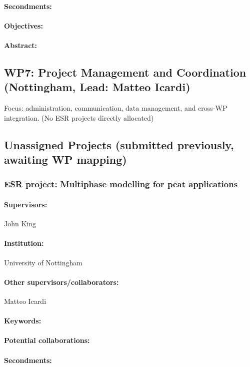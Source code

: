 \documentclass[12pt]{article}
\begin{document}
\paragraph{Secondments:} 
\paragraph{Objectives:} 
\paragraph{Abstract:} 

\subsection{WP7: Project Management and Coordination (Nottingham, Lead: Matteo Icardi)}

Focus: administration, communication, data management, and cross-WP integration. (No ESR projects directly allocated)

\subsection*{Unassigned Projects (submitted previously, awaiting WP mapping)}

\subsubsection*{ESR project: Multiphase modelling for peat applications}
\paragraph{Supervisors:} John King
\paragraph{Institution:} University of Nottingham
\paragraph{Other supervisors/collaborators:} Matteo Icardi
\paragraph{Keywords:} 
\paragraph{Potential collaborations:} 
\paragraph{Secondments:} 
\end{document}
